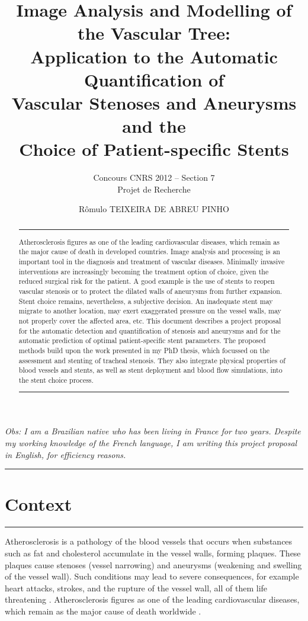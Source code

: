 \documentclass[a4paper]{article}
\title{Image Analysis and Modelling of the Vascular Tree:\\Application to the Automatic Quantification of\\Vascular Stenoses and Aneurysms and the\\Choice of Patient-specific Stents}
\author{Concours CNRS 2012 -- Section 7\\Projet de Recherche}
\date{R\^omulo TEIXEIRA DE ABREU PINHO}
\newcommand{\citep}{\cite}
\begin{document}
\maketitle

\begin{noindent}
{\em Obs: I am a Brazilian native who has been living in France for two years. Despite my working knowledge of the French language, I am writing this project proposal in English, for efficiency reasons.}
\end{noindent}

\begin{abstract}
\hrule
\medskip
Atherosclerosis figures as one of the leading cardiovascular diseases, which remain as the major cause of death in developed countries. Image analysis and processing is an important tool in the diagnosis and treatment of vascular diseases. Minimally invasive interventions are increasingly becoming the treatment option of choice, given the reduced surgical risk for the patient. A good example is the use of stents to reopen vascular stenosis or to protect the dilated walls of aneurysms from further expansion. Stent choice remains, nevertheless, a subjective decision. An inadequate stent may migrate to another location, may exert exaggerated pressure on the vessel walls, may not properly cover the affected area, etc. This document describes a project proposal for the automatic detection and quantification of stenosis and aneurysms and for the automatic prediction of optimal patient-specific stent parameters. The proposed methods build upon the work presented in my PhD thesis, which focussed on the assessment and stenting of tracheal stenosis. They also integrate physical properties of blood vessels and stents, as well as stent deployment and blood flow simulations, into the stent choice process. 
\medskip
\hrule
\end{abstract}


\tableofcontents

\pagebreak

\hrule
\section{Context}
\hrule

\medskip
\medskip

Atherosclerosis is a pathology of the blood vessels that occurs when substances such as fat and cholesterol accumulate in the vessel walls, forming plaques. These plaques cause stenoses (vessel narrowing) and aneurysms (weakening and swelling of the vessel wall). Such conditions may lead to severe consequences, for example heart attacks, strokes, and the rupture of the vessel wall, all of them life threatening \citep{Gennest,Libby}. Atherosclerosis figures as one of the leading cardiovascular diseases, which remain as the major cause of death worldwide \citep{WHO}. 
\end{document}
